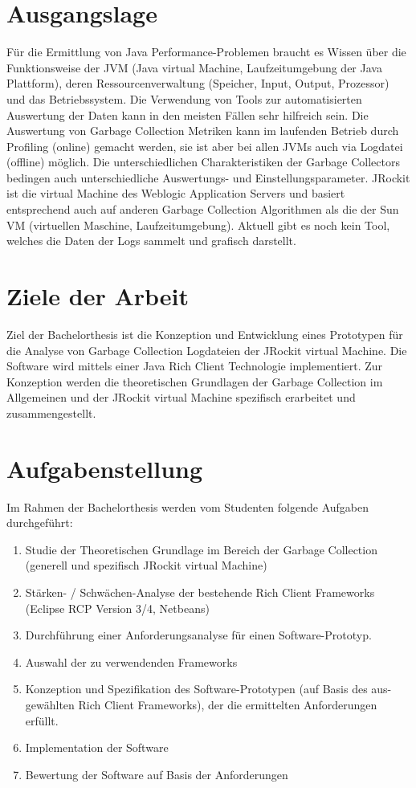\section{Ausgangslage}
Für die Ermittlung von Java Performance-Problemen braucht es Wissen über die Funktionsweise der JVM (Java virtual Machine, Laufzeitumgebung der Java Plattform), deren Ressourcenverwaltung (Speicher, Input, Output, Prozessor) und das Betriebssystem. Die Verwendung von Tools zur automatisierten Auswertung der Daten kann in den meisten Fällen sehr hilfreich sein. 
Die Auswertung von Garbage Collection Metriken kann im laufenden Betrieb durch Profiling (online) gemacht werden, sie ist aber bei allen JVMs auch via Logdatei (offline) möglich. Die unterschiedlichen Charakteristiken der Garbage Collectors bedingen auch unterschiedliche Auswertungs- und Einstellungsparameter. 
JRockit ist die virtual Machine des Weblogic Application Servers und basiert entsprechend auch auf anderen Garbage Collection Algorithmen als die der Sun VM (virtuellen Maschine, Laufzeitumgebung). Aktuell gibt es noch kein Tool, welches die Daten der Logs sammelt und grafisch darstellt.


\section{Ziele der Arbeit}
Ziel der Bachelorthesis ist die Konzeption und Entwicklung eines Prototypen für die Analyse von Garbage Collection Logdateien der JRockit virtual Machine. Die Software wird mittels einer Java Rich Client Technologie implementiert. Zur Konzeption werden die theoretischen Grundlagen der Garbage Collection im Allgemeinen und der JRockit virtual Machine spezifisch erarbeitet und zusammengestellt.

\section{Aufgabenstellung}
Im Rahmen der Bachelorthesis werden vom Studenten folgende Aufgaben durchgeführt:

\begin{enumerate}
\item Studie der Theoretischen Grundlage im Bereich der Garbage Collection 
    (generell und spezifisch JRockit virtual Machine)
\item Stärken- / Schwächen-Analyse der bestehende Rich Client Frameworks
    (Eclipse RCP Version 3/4, Netbeans)
\item Durchführung einer Anforderungsanalyse für einen Software-Prototyp.
\item Auswahl der zu verwendenden Frameworks
\item Konzeption und Spezifikation des Software-Prototypen (auf Basis des aus-
    gewählten Rich Client Frameworks), der die ermittelten Anforderungen erfüllt.  
\item Implementation der Software
\item Bewertung der Software auf Basis der Anforderungen
\end{enumerate}

